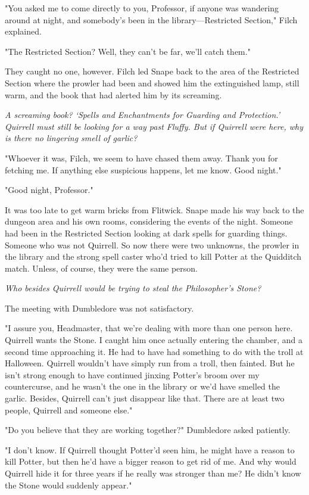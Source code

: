 "You asked me to come directly to you, Professor, if anyone was wandering around at night, and somebody's been in the library—Restricted Section," Filch explained.

"The Restricted Section? Well, they can't be far, we'll catch them."

They caught no one, however. Filch led Snape back to the area of the Restricted Section where the prowler had been and showed him the extinguished lamp, still warm, and the book that had alerted him by its screaming.

\emph{A screaming book? `Spells and Enchantments for Guarding and Protection.' Quirrell must still be looking for a way past Fluffy. But if Quirrell were here, why is there no lingering smell of garlic?}

"Whoever it was, Filch, we seem to have chased them away. Thank you for fetching me. If anything else suspicious happens, let me know. Good night."

"Good night, Professor."

It was too late to get warm bricks from Flitwick. Snape made his way back to the dungeon area and his own rooms, considering the events of the night. Someone had been in the Restricted Section looking at dark spells for guarding things. Someone who was not Quirrell. So now there were two unknowns, the prowler in the library and the strong spell caster who'd tried to kill Potter at the Quidditch match. Unless, of course, they were the same person.

\emph{Who besides Quirrell would be trying to steal the Philosopher's Stone?}

The meeting with Dumbledore was not satisfactory.

"I assure you, Headmaster, that we're dealing with more than one person here. Quirrell wants the Stone. I caught him once actually entering the chamber, and a second time approaching it. He had to have had something to do with the troll at Halloween. Quirrell wouldn't have simply run from a troll, then fainted. But he isn't strong enough to have continued jinxing Potter's broom over my countercurse, and he wasn't the one in the library or we'd have smelled the garlic. Besides, Quirrell can't just disappear like that. There are at least two people, Quirrell and someone else."

"Do you believe that they are working together?" Dumbledore asked patiently.

"I don't know. If Quirrell thought Potter'd seen him, he might have a reason to kill Potter, but then he'd have a bigger reason to get rid of me. And why would Quirrell hide it for three years if he really was stronger than me? He didn't know the Stone would suddenly appear."

